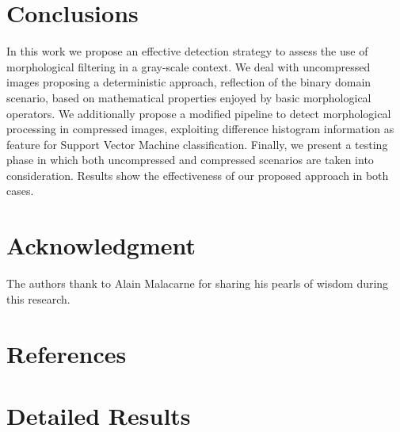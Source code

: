 \documentclass[review]{elsarticle}
\begin{document}
\section{Conclusions}
\label{sec:conclusions}
In this work we propose an effective detection strategy to assess the use of morphological filtering in a gray-scale context. We deal with uncompressed images proposing a deterministic approach, reflection of the binary domain scenario, based on mathematical properties enjoyed by basic morphological operators. We additionally propose a modified pipeline to detect morphological processing in compressed images, exploiting difference histogram information as feature for Support Vector Machine classification. Finally, we present a testing phase in which both uncompressed and compressed scenarios are taken into consideration. Results show the effectiveness of our proposed approach in both cases.  
 
\section*{Acknowledgment}
The authors thank to Alain Malacarne for sharing his pearls of wisdom during this research. 

\section*{References}


\appendix
\section{Detailed Results}
\label{app:detailed_compress}
\end{document}
